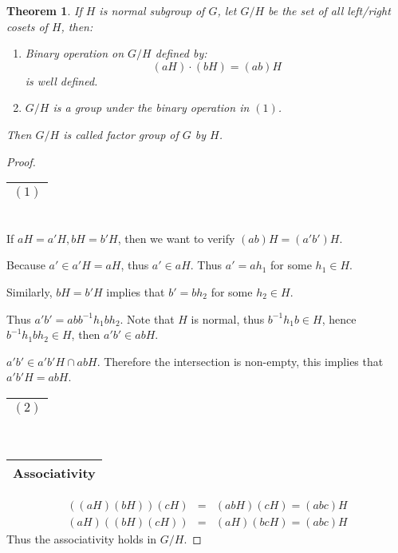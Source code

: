 \documentclass{article}
\theoremstyle{MyNonumberplain}
\theoremstyle{break}
\newtheorem*{proof}{Proof. }
\theoremstyle{break}
\newtheorem{theorem}{Theorem}[section]
\theoremstyle{break}
\theoremstyle{definition}
\theoremstyle{break}
\begin{document}
\begin{thmbox}
    \begin{theorem}
        If $H$ is normal subgroup of $G$, let $G / H$ be the set of all left/right
        cosets of $H$, then:\\
        \begin{enumerate}
        \item Binary operation on $G / H$ defined by:
        \[ (a H) \cdot (b H) = (a b) H \]
        is well defined.\bigskip
        \item $G / H$ is a group under the binary operation in $(1)$.\bigskip
        \end{enumerate}
        Then $G / H$ is called factor group of $G$ by $H$.
    \end{theorem}
    \begin{prfbox}
        \begin{proof}
            \begin{tabular}{|c|}
                \hline
                $(1)$\\
                \hline
              \end{tabular}\\
              
              If $a H = a' H, b H = b' H$, then we want to verify $(a b) H = (a' b') H$.\bigskip
              
              Because $a' \in a' H = a H$, thus $a' \in a H$. Thus $a' = a h_1$ for some
              $h_1 \in H$.\bigskip
              
              Similarly, $b H = b' H$ implies that $b' = b h_2$ for some $h_2 \in H$.\bigskip
              
              Thus $a' b' = a b b^{- 1} h_1 b h_2$. Note that $H$ is normal, thus $b^{- 1}
              h_1 b \in H$, hence $b^{- 1} h_1 b h_2 \in H$, then $a' b' \in a b H$.\bigskip
              
              $a' b' \in a' b' H \cap a b H$. Therefore the intersection is non-empty, this
              implies that $a' b' H = a b H$.\bigskip
              
              \begin{tabular}{|c|}
                \hline
                $(2)$\\
                \hline
              \end{tabular}\\
              
              \begin{tabular}{|c|}
                \hline
                Associativity\\
                \hline
              \end{tabular}
              \begin{eqnarray*}
                ((a H) (b H)) (c H) & = & (a b H) (c H) = (a b c) H\\
                (a H) ((b H) (c H)) & = & (a H) (b c H) = (a b c) H
              \end{eqnarray*}
              Thus the associativity holds in $G / H$.\bigskip
              

\end{proof}
\end{prfbox}
\end{thmbox}
\end{document}
